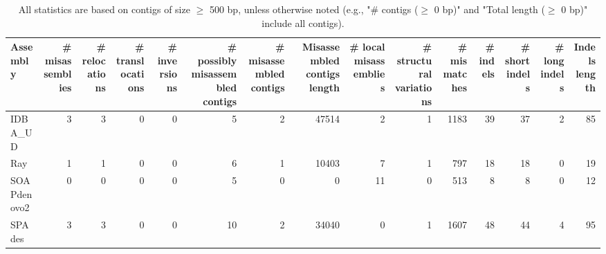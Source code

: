 \documentclass[12pt,a4paper]{article}
\begin{document}
\begin{table}[ht]
\begin{center}
\caption{All statistics are based on contigs of size $\geq$ 500 bp, unless otherwise noted (e.g., "\# contigs ($\geq$ 0 bp)" and "Total length ($\geq$ 0 bp)" include all contigs).}
\begin{tabular}{|l*{14}{|r}|}
\hline
Assembly & \# misassemblies &     \# relocations &     \# translocations &     \# inversions & \# possibly misassembled contigs & \# misassembled contigs & Misassembled contigs length & \# local misassemblies & \# structural variations & \# mismatches & \# indels &     \# short indels &     \# long indels & Indels length \\ \hline
IDBA\_UD & 3 & 3 & 0 & 0 & 5 & 2 & 47514 & 2 & 1 & 1183 & 39 & 37 & 2 & 85 \\ \hline
Ray & 1 & 1 & 0 & 0 & 6 & 1 & 10403 & 7 & 1 & 797 & 18 & 18 & 0 & 19 \\ \hline
SOAPdenovo2 & 0 & 0 & 0 & 0 & 5 & 0 & 0 & 11 & 0 & 513 & 8 & 8 & 0 & 12 \\ \hline
SPAdes & 3 & 3 & 0 & 0 & 10 & 2 & 34040 & 0 & 1 & 1607 & 48 & 44 & 4 & 95 \\ \hline
\end{tabular}
\end{center}
\end{table}
\end{document}
